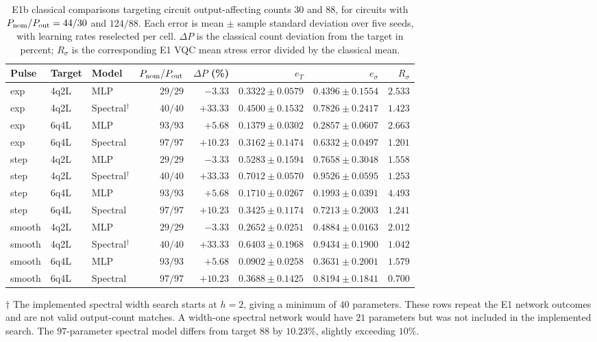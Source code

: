\documentclass[11pt]{article}
\begin{document}
\begin{table}[htbp]
\centering
\caption{E1b classical comparisons targeting circuit output-affecting counts $30$ and $88$, for circuits with $P_{\rm nom}/P_{\rm out}=44/30$ and $124/88$. Each error is mean $\pm$ sample standard deviation over five seeds, with learning rates reselected per cell. $\Delta P$ is the classical count deviation from the target in percent; $R_\sigma$ is the corresponding E1 VQC mean stress error divided by the classical mean.}
\label{tab:e1b}
\scriptsize
\setlength{\tabcolsep}{3pt}
\begin{tabular}{lllrrrrr}
\toprule
Pulse & Target & Model & $P_{\rm nom}/P_{\rm out}$ & $\Delta P$ (\%) & $e_T$ & $e_\sigma$ & $R_\sigma$ \\
\midrule
exp & 4q2L & MLP & $29/29$ & $-3.33$ & $0.3322\pm0.0579$ & $0.4396\pm0.1554$ & $2.533$ \\
exp & 4q2L & Spectral$^{\dagger}$ & $40/40$ & $+33.33$ & $0.4500\pm0.1532$ & $0.7826\pm0.2417$ & $1.423$ \\
exp & 6q4L & MLP & $93/93$ & $+5.68$ & $0.1379\pm0.0302$ & $0.2857\pm0.0607$ & $2.663$ \\
exp & 6q4L & Spectral & $97/97$ & $+10.23$ & $0.3162\pm0.1474$ & $0.6332\pm0.0497$ & $1.201$ \\
\midrule
step & 4q2L & MLP & $29/29$ & $-3.33$ & $0.5283\pm0.1594$ & $0.7658\pm0.3048$ & $1.558$ \\
step & 4q2L & Spectral$^{\dagger}$ & $40/40$ & $+33.33$ & $0.7012\pm0.0570$ & $0.9526\pm0.0595$ & $1.253$ \\
step & 6q4L & MLP & $93/93$ & $+5.68$ & $0.1710\pm0.0267$ & $0.1993\pm0.0391$ & $4.493$ \\
step & 6q4L & Spectral & $97/97$ & $+10.23$ & $0.3425\pm0.1174$ & $0.7213\pm0.2003$ & $1.241$ \\
\midrule
smooth & 4q2L & MLP & $29/29$ & $-3.33$ & $0.2652\pm0.0251$ & $0.4884\pm0.0163$ & $2.012$ \\
smooth & 4q2L & Spectral$^{\dagger}$ & $40/40$ & $+33.33$ & $0.6403\pm0.1968$ & $0.9434\pm0.1900$ & $1.042$ \\
smooth & 6q4L & MLP & $93/93$ & $+5.68$ & $0.0902\pm0.0258$ & $0.3631\pm0.2001$ & $1.579$ \\
smooth & 6q4L & Spectral & $97/97$ & $+10.23$ & $0.3688\pm0.1425$ & $0.8194\pm0.1841$ & $0.700$ \\
\bottomrule
\end{tabular}
\par\smallskip
\begin{minipage}{\textwidth}\footnotesize
$\dagger$ The implemented spectral width search starts at $h=2$, giving a minimum of $40$ parameters. These rows repeat the E1 network outcomes and are not valid output-count matches. A width-one spectral network would have $21$ parameters but was not included in the implemented search. The $97$-parameter spectral model differs from target $88$ by $10.23\%$, slightly exceeding $10\%$.
\end{minipage}
\end{table}
\end{document}
